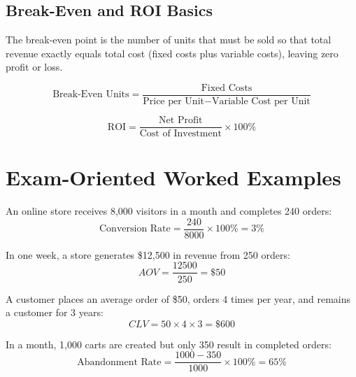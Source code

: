 \documentclass[11pt,a4paper]{article}
\begin{document}
\subsection{Break-Even and ROI Basics}
\begin{definitionbox}
The break-even point is the number of units that must be sold so that total revenue exactly equals total cost (fixed costs plus variable costs), leaving zero profit or loss.
\end{definitionbox}
$$
\text{Break-Even Units} = \frac{\text{Fixed Costs}}{\text{Price per Unit} - \text{Variable Cost per Unit}}
$$
\begin{definitionbox}
$$
\text{ROI} = \frac{\text{Net Profit}}{\text{Cost of Investment}} \times 100\%
$$
\end{definitionbox}

\section{Exam-Oriented Worked Examples}

\begin{examplebox}
An online store receives 8,000 visitors in a month and completes 240 orders:
$$
\text{Conversion Rate} = \frac{240}{8000} \times 100\% = 3\%
$$
\end{examplebox}

\begin{examplebox}
In one week, a store generates \$12,500 in revenue from 250 orders:
$$
AOV = \frac{12500}{250} = \$50
$$
\end{examplebox}

\begin{examplebox}
A customer places an average order of \$50, orders 4 times per year, and remains a customer for 3 years:
$$
CLV = 50 \times 4 \times 3 = \$600
$$
\end{examplebox}

\begin{examplebox}
In a month, 1,000 carts are created but only 350 result in completed orders:
$$
\text{Abandonment Rate} = \frac{1000 - 350}{1000} \times 100\% = 65\%
$$
\end{examplebox}
\end{document}
